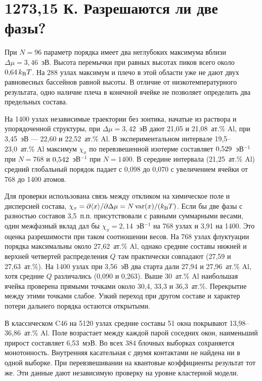 \documentclass[11pt,a4paper]{article}
\begin{document}
\clearpage

\section*{1273,15 К. Разрешаются ли две фазы?}
При \(N=96\) параметр порядка имеет два неглубоких максимума вблизи
\(\Delta\mu=3{,}46\)~эВ. Высота перемычки при равных высотах пиков
всего около \(0{,}64\,k_{\rm B}T\). На 288 узлах максимум и плечо в
этой области уже не дают двух равновесных бассейнов равной высоты.
В отличие от низкотемпературного результата, одно наличие плеча
в конечной ячейке не позволяет определить два предельных состава.

На 1400 узлах независимые траектории без зонтика, начатые из раствора
и упорядоченной структуры, при \(\Delta\mu=3{,}42\)~эВ дают
21,05 и 21,08~ат.\% Al, при 3,45~эВ --- 22,60 и 22,52~ат.\% Al.
В экспериментальном интервале 19,5--23,0~ат.\% Al максимум \(\chi_x\)
по перевзвешенной изотерме составляет \(0{,}529\)~эВ\(^{-1}\) при
\(N=768\) и \(0{,}542\)~эВ\(^{-1}\) при \(N=1400\). В середине
интервала (21,25~ат.\% Al) средний глобальный порядок падает с 0,098
до 0,070 с увеличением ячейки от 768 до 1400 атомов.

Для проверки использована связь между откликом на химическое поле и
дисперсией состава, \(\chi_x=\partial\langle x\rangle/\partial\Delta\mu
=N\operatorname{var}(x)/(k_{\rm B}T)\). Если бы две фазы с разностью
составов 3,5~п.п. присутствовали с равными суммарными весами, один
межфазный вклад дал бы \(\chi_x=2{,}14\)~эВ\(^{-1}\) на 768 узлах
и 3,91 на 1400. Это оценка разрешимости при таком соотношении весов.
На 768 узлах флуктуации порядка максимальны около 27,62~ат.\% Al,
однако средние составы нижней и верхней четвертей распределения \(Q\)
там практически совпадают (27,59 и 27,63~ат.\%). На 1400 узлах при
3,56~эВ два старта дали 27,94 и 27,96~ат.\% Al, хотя средние \(Q\)
различались (0,090 и 0,263). Выше 30~ат.\% Al наибольшая ячейка
проверена прямыми точками около 30,4, 33,3 и 36,3~ат.\%. Перекрытие
между этими точками слабое. Узкий переход при
другом составе и характер потери дальнего порядка остаются открытыми.

В классическом C46 на 5120 узлах средние составы 51 окна покрывают
13,98--36,86~ат.\% Al. Поле возрастает между каждой парой соседних окон,
наименьший прирост составляет 6,53~мэВ. Во всех 384 блочных выборках
сохраняется монотонность. Внутренняя касательная с двумя контактами
не найдена ни в одной выборке. При перевзвешивании на квантовые
коэффициенты результат тот же. Эти данные дают независимую проверку
на уровне кластерной модели.
\end{document}

